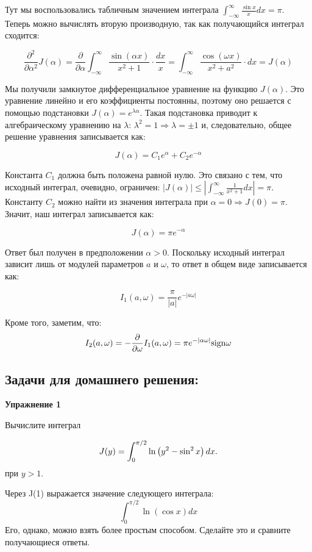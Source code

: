 \documentclass[a4paper,12pt]{article}
\begin{document}
\noindent
Тут мы воспользовались табличным значением интеграла $\int_{-\infty}^{\infty}\frac{\sin x}{x}dx=\pi$.
Теперь можно вычислять вторую производную, так как получающийся интеграл
сходится:

\[
\frac{\partial^{2}}{\partial\alpha^{2}}J(\alpha)=\frac{\partial}{\partial\alpha}\int_{-\infty}^{\infty}\frac{\sin(\alpha x)}{x^{2}+1}\cdot\frac{dx}{x}=\int_{-\infty}^{\infty}\frac{\cos(\omega x)}{x^{2}+a^{2}}\cdot dx=J(\alpha)
\]

\noindent
Мы получили замкнутое дифференциальное уравнение на функцию $J(\alpha)$.
Это уравнение линейно и его коэффициенты постоянны, поэтому оно
решается с помощью подстановки $J(\alpha)=e^{\lambda\alpha}$. Такая
подстановка приводит к алгебраическому уравнению на $\lambda$: $\lambda^{2}=1\Rightarrow\lambda=\pm1$
и, следовательно, общее решение уравнения записывается как:

\[
J(\alpha)=C_{1}e^{\alpha}+C_{2}e^{-\alpha}
\]

\noindent
Константа $C_{1}$ должна быть положена равной нулю. Это связано с
тем, что исходный интеграл, очевидно, ограничен: $\left|J\left(\alpha\right)\right|\leq\left|\int_{-\infty}^{\infty}\frac{1}{x^{2}+1}dx\right|=\pi$.
Константу $C_{2}$ можно найти из значения интеграла при $\alpha=0\Rightarrow J(0)=\pi$.
Значит, наш интеграл записывается как:

\[
J(\alpha)=\pi e^{-\alpha}
\]

\noindent
Ответ был получен в предположении $\alpha>0$. Поскольку исходный
интеграл зависит лишь от модулей параметров $a$ и $\omega$, то ответ
в общем виде записывается как:

\[
I_{1}(a,\omega)=\frac{\pi}{\left|a\right|}e^{-\left|a\omega\right|}
\]

\noindent
Кроме того, заметим, что:
\[
I_{2}(a,\omega)=-\frac{\partial}{\partial\omega}I_{1}(a,\omega)=\pi e^{-\left|\alpha\omega\right|}{\rm sign}\omega
\]
\subsection*{Задачи для домашнего решения:}

\noindent \textbf{Упражнение 1}

\noindent Вычислите интеграл 

\begin{equation}
J(y)=\int_{0}^{\pi/2}\ln\left(y^2-\sin^2x\right)dx.\notag
\end{equation}
при $y>1$. 

\noindent
Через J(1) выражается значение следующего интеграла:
$$
\int_{0}^{\pi/2}\ln\left(\cos x\right) dx
$$
Его, однако, можно взять более простым способом. Сделайте это и сравните получающиеся ответы.
\end{document}
